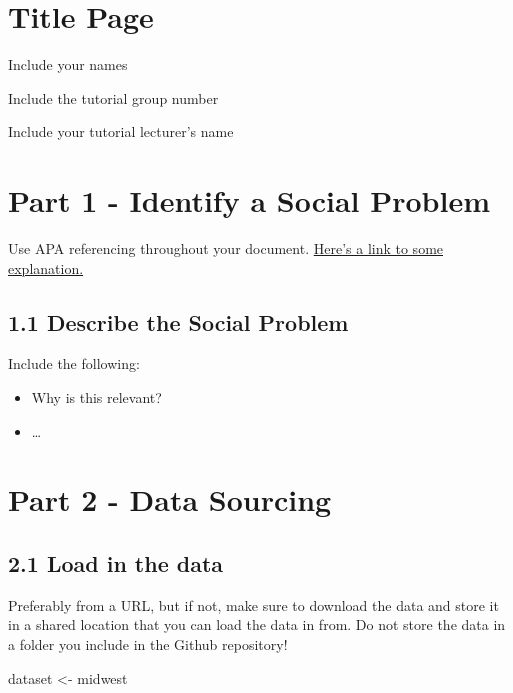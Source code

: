 \documentclass[
]{article}
\newenvironment{Shaded}{\begin{snugshade}}{\end{snugshade}}
\newcommand{\NormalTok}[1]{#1}
\newcommand{\OtherTok}[1]{\textcolor[rgb]{0.56,0.35,0.01}{#1}}
\begin{document}
\section{Title Page}\label{title-page}

Include your names

Include the tutorial group number

Include your tutorial lecturer's name

\section{Part 1 - Identify a Social
Problem}\label{part-1---identify-a-social-problem}

Use APA referencing throughout your document.
\href{https://www.mendeley.com/guides/apa-citation-guide/}{Here's a link
to some explanation.}

\subsection{1.1 Describe the Social
Problem}\label{describe-the-social-problem}

Include the following:

\begin{itemize}
\item
  Why is this relevant?
\item
  \ldots{}
\end{itemize}

\section{Part 2 - Data Sourcing}\label{part-2---data-sourcing}

\subsection{2.1 Load in the data}\label{load-in-the-data}

Preferably from a URL, but if not, make sure to download the data and
store it in a shared location that you can load the data in from. Do not
store the data in a folder you include in the Github repository!

\begin{Shaded}
\begin{Highlighting}[]
\NormalTok{dataset }\OtherTok{\textless{}{-}}\NormalTok{ midwest}
\end{Highlighting}
\end{Shaded}
\end{document}
